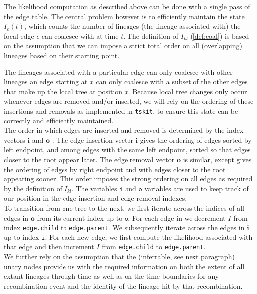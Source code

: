 \documentclass{article}
\begin{document}
The likelihood computation as described above can be done with a single pass 
of the edge table.
The central problem however is to efficiently maintain the state $I_e(t)$, which counts 
the number of lineages (the lineage associated with) the focal edge $\epsilon$ can coalesce 
with at time $t$. 
The definition of $I_{kl}$ (\ref{def:coal}) is based on the assumption 
that we can impose a strict total order on all (overlapping) lineages based on their 
starting point.

The lineages associated with a particular edge can only coalesce with other lineages 
an edge starting at $x$ can only coalesce 
with a subset of the other edges that make up the local tree at position $x$.
Because local tree changes only occur whenever edges are removed and/or inserted,
we will rely on the ordering of these insertions and removals as implemented in
\texttt{tskit}, to ensure this state can be correctly and efficiently maintained.\\


The order in which edges are inserted and removed is determined by the index 
vectors $\textbf{i}$ and $\textbf{o}$ \citep{kelleher_efficient_2016}. The edge insertion vector 
$\textbf{i}$ gives the ordering of edges sorted by left endpoint, and among edges 
with the same left endpoint, sorted so that edges closer to the root appear later. 
The edge removal vector $\textbf{o}$ is similar, except gives the ordering of edges 
by right endpoint and with edges closer to the root appearing sooner. This order imposes the 
strong ordering on all edges as required by the definition of $I_{kl}$. The variables $\texttt{i}$ and 
$\texttt{o}$ variables are used to keep track of our position in the edge insertion and edge removal 
indexes.\\

To transition from one tree to the next, we first iterate across the indices of all edges 
in $\textbf{o}$ from its current index up to $\texttt{o}$. For each edge in we decrement $I$ 
from index \texttt{edge.child} to \texttt{edge.parent}. We subsequently iterate across the 
edges in $\textbf{i}$ up to index $\texttt{i}$. For each new edge, we first compute the likelihood 
associated with that edge and then 
increment $I$ from \texttt{edge.child} to \texttt{edge.parent}.\\

We further rely on the assumption that the (inferrable, see next paragraph) unary nodes 
provide us with the required information on both the extent of all extant lineages through 
time as well as on the time boundaries for any recombination event and the identity of the 
lineage hit by that recombination.
\end{document}
